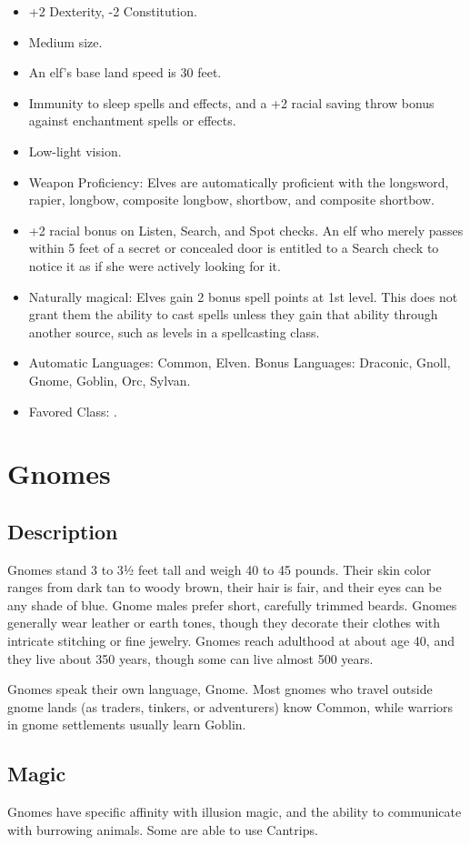 \begin{itemize}
 \item +2 Dexterity, -2 Constitution.
 \item Medium size.
 \item An elf's base land speed is 30 feet.
 \item Immunity to sleep spells and effects, and a +2 racial saving throw bonus against enchantment spells or effects.
 \item Low-light vision.
 \item Weapon Proficiency: Elves are automatically proficient with the longsword, rapier, longbow, composite longbow, shortbow, and composite shortbow.
 \item +2 racial bonus on Listen, Search, and Spot checks. An elf who merely passes within 5 feet of a secret or concealed door is entitled to a Search check to notice it as if she were actively looking for it.
 \item Naturally magical: Elves gain 2 bonus spell points at 1st level. This does not grant them the ability to cast spells unless they gain that ability through another source, such as levels in a spellcasting class.
 \item Automatic Languages: Common, Elven. Bonus Languages: Draconic, Gnoll, Gnome, Goblin, Orc, Sylvan.
 \item Favored Class: .
\end{itemize}
\section{Gnomes}
\subsection{Description}
Gnomes stand 3 to 3½ feet tall and weigh 40 to 45 pounds. Their skin color ranges from dark tan to woody brown, their hair is fair, and their eyes can be any shade of blue. Gnome males prefer short, carefully trimmed beards. Gnomes generally wear leather or earth tones, though they decorate their clothes with intricate stitching or fine jewelry. Gnomes reach adulthood at about age 40, and they live about 350 years, though some can live almost 500 years.

Gnomes speak their own language, Gnome. Most gnomes who travel outside gnome lands (as traders, tinkers, or adventurers) know Common, while warriors in gnome settlements usually learn Goblin.
\subsection{Magic}
Gnomes have specific affinity with illusion magic, and the ability to communicate with burrowing animals. Some are able to use Cantrips.

